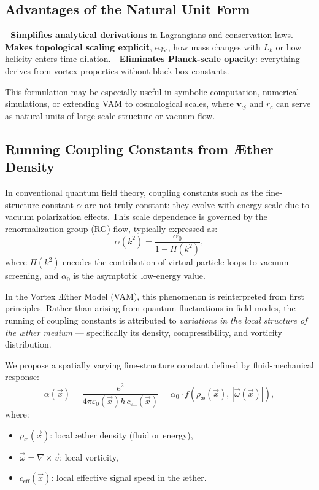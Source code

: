\documentclass[12pt]{article}
\begin{document}
\subsection*{Advantages of the Natural Unit Form}

- \textbf{Simplifies analytical derivations} in Lagrangians and conservation laws.
- \textbf{Makes topological scaling explicit}, e.g., how mass changes with \( L_k \) or how helicity enters time dilation.
- \textbf{Eliminates Planck-scale opacity}: everything derives from vortex properties without black-box constants.

This formulation may be especially useful in symbolic computation, numerical simulations, or extending VAM to cosmological scales, where \( \mathbf{v}_{\scriptscriptstyle\boldsymbol{\circlearrowleft}} \) and \( r_c \) can serve as natural units of large-scale structure or vacuum flow.
\subsection{Running Coupling Constants from Æther Density}

In conventional quantum field theory, coupling constants such as the fine-structure constant \( \alpha \) are not truly constant: they evolve with energy scale due to vacuum polarization effects. This scale dependence is governed by the renormalization group (RG) flow, typically expressed as:
\begin{equation}
\alpha(k^2) = \frac{\alpha_0}{1 - \Pi(k^2)},
\end{equation}
where \( \Pi(k^2) \) encodes the contribution of virtual particle loops to vacuum screening, and \( \alpha_0 \) is the asymptotic low-energy value.

\vspace{0.5em}

In the Vortex Æther Model (VAM), this phenomenon is reinterpreted from first principles. Rather than arising from quantum fluctuations in field modes, the running of coupling constants is attributed to \emph{variations in the local structure of the æther medium} — specifically its density, compressibility, and vorticity distribution.

We propose a spatially varying fine-structure constant defined by fluid-mechanical response:
\begin{equation}
\alpha(\vec{x}) = \frac{e^2}{4\pi \varepsilon_0(\vec{x}) \hbar \, c_{\text{eff}}(\vec{x})} = \alpha_0 \cdot f\left( \rho_\text{\ae}(\vec{x}), \, |\vec{\omega}(\vec{x})| \right),
\end{equation}
where:
\begin{itemize}
    \item \( \rho_\text{\ae}(\vec{x}) \): local æther density (fluid or energy),
    \item \( \vec{\omega} = \nabla \times \vec{v} \): local vorticity,
    \item \( c_{\text{eff}}(\vec{x}) \): local effective signal speed in the æther.
\end{itemize}
\end{document}
